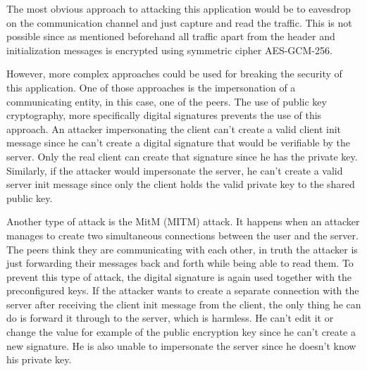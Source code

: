 The most obvious approach to attacking this application would be to eavesdrop on the communication channel and just capture and read the traffic. This is not possible since as mentioned beforehand all traffic apart from the header and initialization messages is encrypted using symmetric cipher AES-GCM-256.

However, more complex approaches could be used for breaking the security of this application. One of those approaches is the impersonation of a communicating entity, in this case, one of the peers. The use of public key cryptography, more specifically digital signatures prevents the use of this approach. An attacker impersonating the client can't create a valid client init message since he can't create a digital signature that would be verifiable by the server. Only the real client can create that signature since he has the private key. Similarly, if the attacker would impersonate the server, he can't create a valid server init message since only the client holds the valid private key to the shared public key.

Another type of attack is the MitM (\acl{MITM}) attack. It happens when an attacker manages to create two simultaneous connections between the user and the server. The peers think they are communicating with each other, in truth the attacker is just forwarding their messages back and forth while being able to read them. To prevent this type of attack, the digital signature is again used together with the preconfigured keys. If the attacker wants to create a separate connection with the server after receiving the client init message from the client, the only thing he can do is forward it through to the server, which is harmless. He can't edit it or change the value for example of the public encryption key since he can't create a new signature. He is also unable to impersonate the server since he doesn't know his private key.
